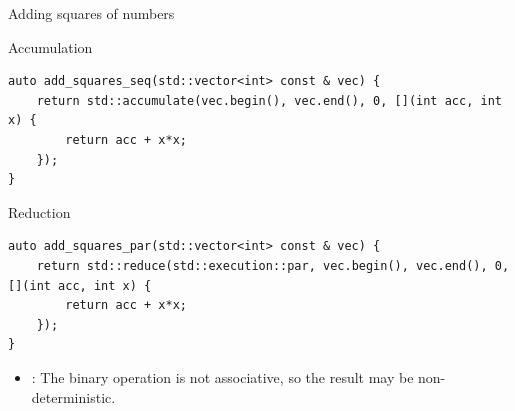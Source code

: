 \begin{frame}[t,fragile]{Adding squares of numbers}
\begin{block}{Accumulation}
\begin{lstlisting}
auto add_squares_seq(std::vector<int> const & vec) {
    return std::accumulate(vec.begin(), vec.end(), 0, [](int acc, int x) {
        return acc + x*x;
    });
}
\end{lstlisting}
\end{block}

\begin{block}{Reduction}
\begin{lstlisting}
auto add_squares_par(std::vector<int> const & vec) {
    return std::reduce(std::execution::par, vec.begin(), vec.end(), 0, [](int acc, int x) {
        return acc + x*x;
    });
}
\end{lstlisting}
\end{block}

\begin{itemize}
  \item {}: The binary operation is not associative, so the result may be non-deterministic.
\end{itemize}

\end{frame}